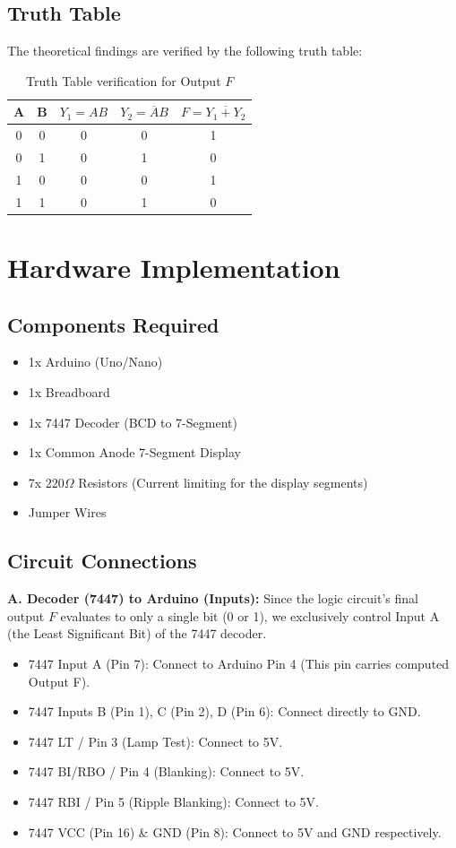 \documentclass[12pt, a4paper]{report}
\begin{document}
\subsection{Truth Table}
The theoretical findings are verified by the following truth table:
\begin{table}[h]
\centering
\begin{tabular}{|c|c|c|c|c|}
\hline
\textbf{A} & \textbf{B} & \textbf{$Y_1 = AB$} & \textbf{$Y_2 = \overline{A}B$} & \textbf{$F = \overline{Y_1 + Y_2}$} \\ \hline
0 & 0 & 0 & 0 & 1 \\ \hline
0 & 1 & 0 & 1 & 0 \\ \hline
1 & 0 & 0 & 0 & 1 \\ \hline
1 & 1 & 0 & 1 & 0 \\ \hline
\end{tabular}
\caption{Truth Table verification for Output $F$}
\end{table}

\section{Hardware Implementation}
\subsection{Components Required}
\begin{itemize}
    \item 1x Arduino (Uno/Nano)
    \item 1x Breadboard
    \item 1x 7447 Decoder (BCD to 7-Segment)
    \item 1x Common Anode 7-Segment Display
    \item 7x $220\Omega$ Resistors (Current limiting for the display segments)
    \item Jumper Wires
\end{itemize}

\subsection{Circuit Connections}
\textbf{A. Decoder (7447) to Arduino (Inputs):}
Since the logic circuit's final output $F$ evaluates to only a single bit (0 or 1), we exclusively control Input A (the Least Significant Bit) of the 7447 decoder.
\begin{itemize}
    \item 7447 Input A (Pin 7): Connect to Arduino Pin 4 (This pin carries computed Output F).
    \item 7447 Inputs B (Pin 1), C (Pin 2), D (Pin 6): Connect directly to GND.
    \item 7447 LT / Pin 3 (Lamp Test): Connect to 5V.
    \item 7447 BI/RBO / Pin 4 (Blanking): Connect to 5V.
    \item 7447 RBI / Pin 5 (Ripple Blanking): Connect to 5V.
    \item 7447 VCC (Pin 16) \& GND (Pin 8): Connect to 5V and GND respectively.
\end{itemize}
\end{document}
